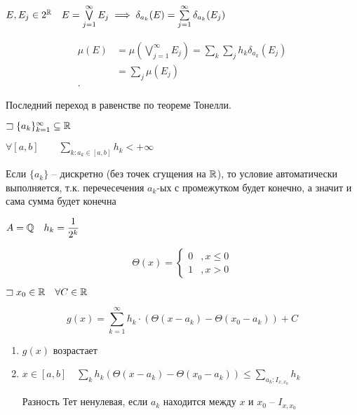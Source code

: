 $E, E_j\in 2^{\R}\quad E = \bigvee\limits_{j=1}^{\infty }E_j \implies \delta_{a_k}(E) = \sum_{j=1}^{\infty } \delta_{a_k}(E_j)$

\begin{align*}
    \mu(E)  &= \mu(\bigvee_{j=1}^{\infty }E_j) = \sum_k\sum_j h_k\delta_{a_k}(E_j)\\
    &= \sum_j \mu(E_j)\\
.\end{align*}

Последний переход в равенстве по теореме Тонелли.

\begin{note}
    $\sqsupset \{a_k\}_{k=1}^{\infty }\subseteq \mathbb{R}$

    $\forall [a,b]\qquad \sum_{k: a_k\in [a,b]}h_k < + \infty $
\end{note}

\begin{example}
    Если $\{a_k\}$ -- дискретно (без точек сгущения на $\mathbb{R}$), то условие автоматически выполняется, т.к. перечесечения $a_k$-ых с промежутком будет конечно,
    а значит и сама сумма будет конечна

    $A = \mathbb{Q}\quad h_k = \dfrac{1}{2^k}$
\end{example}

\begin{definition}
    \[\Theta(x) = \begin{cases}
        0&, x\leqslant 0\\
        1&, x>0
    \end{cases}\]

    $\sqsupset x_0\in \mathbb{R}\quad \forall C\in \mathbb{R}$

    \[g(x) = \sum_{k=1}^{\infty } h_k\cdot \left(\Theta(x - a_k) - \Theta(x_0 - a_k)\right) + C\]

    \begin{enumerate}
        \item $g(x)$ возрастает
        \item $x\in [a,b]\quad \sum_k h_k(\Theta(x - a_k) - \Theta(x_0 - a_k)) \leqslant \sum_{a_k:I_{x, x_0}} h_k$

        Разность Тет ненулевая, если $a_k$ находится между $x$ и $x_0$ -- $I_{x, x_0}$
    \end{enumerate}
\end{definition}

